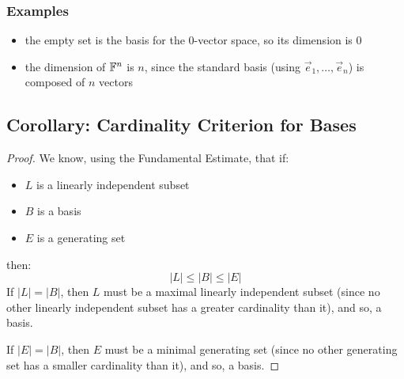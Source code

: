 \documentclass{exam}
\begin{document}
\subsubsection{Examples}

\begin{itemize}
    \item the empty set is the basis for the 0-vector space, so its dimension is 0
    \item the dimension of $\mathbb{F}^n$ is $n$, since the standard basis (using $\vec{e}_1, \ldots, \vec{e}_n$) is composed of $n$ vectors
\end{itemize}

\subsection{Corollary: Cardinality Criterion for Bases}\label{c167}


\begin{proof}

We know, using the Fundamental Estimate, that if:
\begin{itemize}
    \item $L$ is a linearly independent subset
    \item $B$ is a basis
    \item $E$ is a generating set
\end{itemize}
then:
\[
|L| \leq |B| \leq |E|
\]
If $|L| = |B|$, then $L$ must be a maximal linearly independent subset (since no other linearly independent subset has a greater cardinality than it), and so, a basis.

If $|E| = |B|$, then $E$ must be a minimal generating set (since no other generating set has a smaller cardinality than it), and so, a basis.

\end{proof}
\end{document}
